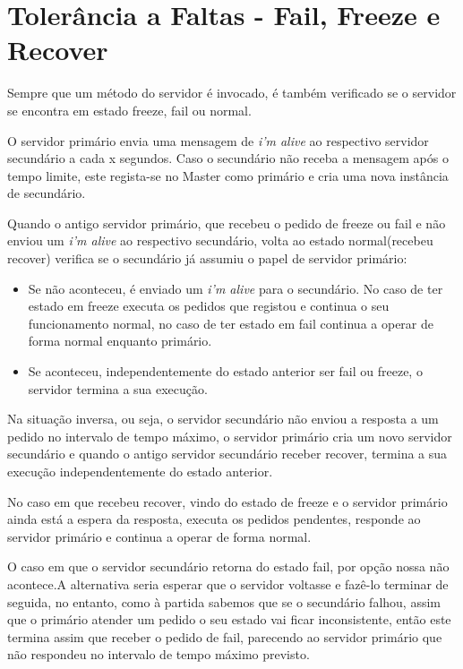 \section{Tolerância a Faltas - Fail, Freeze e Recover}

Sempre que um método do servidor é invocado, é também verificado se o servidor se encontra em estado freeze, fail ou normal.

O servidor primário envia uma mensagem de \textit{i’m alive} ao respectivo servidor secundário a cada x segundos. Caso o secundário não receba a mensagem após o tempo limite, este regista-se no Master como primário e cria uma nova instância de secundário.

Quando o antigo servidor primário, que recebeu o pedido de freeze ou fail e não enviou um \textit{i’m alive} ao respectivo secundário, volta ao estado normal(recebeu recover) verifica se o secundário já assumiu o papel de servidor primário:
\begin{itemize}
\item Se não aconteceu, é enviado um \textit{i’m alive} para o secundário. No caso de ter estado em freeze executa os pedidos que registou e continua o seu funcionamento normal, no caso de ter estado em fail continua a operar de forma normal enquanto primário.
\item Se aconteceu, independentemente do estado anterior ser fail ou freeze, o servidor termina a sua execução.
\end{itemize}
Na situação inversa, ou seja, o servidor secundário não enviou a resposta a um pedido no intervalo de tempo máximo, o servidor primário cria um novo servidor secundário e quando o antigo servidor secundário receber recover, termina a sua execução independentemente do estado anterior. 

No caso em que recebeu recover, vindo do estado de freeze e o servidor primário ainda está a espera da resposta, executa os pedidos pendentes, responde ao servidor primário e continua a operar de forma normal. 

O caso em que o servidor secundário retorna do estado fail, por opção nossa não acontece.A alternativa seria esperar que o servidor voltasse e fazê-lo terminar de seguida, no entanto, como à partida sabemos que se o secundário falhou, assim que o primário atender um pedido o seu estado vai ficar inconsistente, então este termina assim que receber o pedido de fail, parecendo ao servidor primário que não respondeu no intervalo de tempo máximo previsto.

